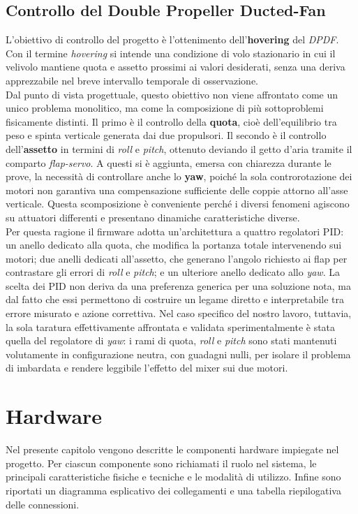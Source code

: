 \documentclass[11pt]{report}
\begin{document}
	\section{Controllo del Double Propeller Ducted-Fan}
	L'obiettivo di controllo del progetto è l'ottenimento dell'\textbf{hovering} del \textit{DPDF}. Con il termine \textit{hovering} si intende una condizione di volo stazionario in cui il velivolo mantiene quota e assetto prossimi ai valori desiderati, senza una deriva apprezzabile nel breve intervallo temporale di osservazione.\\
	Dal punto di vista progettuale, questo obiettivo non viene affrontato come un unico problema monolitico, ma come la composizione di più sottoproblemi fisicamente distinti. Il primo è il controllo della \textbf{quota}, cioè dell'equilibrio tra peso e spinta verticale generata dai due propulsori. Il secondo è il controllo dell'\textbf{assetto} in termini di \textit{roll} e \textit{pitch}, ottenuto deviando il getto d'aria tramite il comparto \textit{flap-servo}. A questi si è aggiunta, emersa con chiarezza durante le prove, la necessità di controllare anche lo \textbf{yaw}, poiché la sola controrotazione dei motori non garantiva una compensazione sufficiente delle coppie attorno all'asse verticale. Questa scomposizione è conveniente perché i diversi fenomeni agiscono su attuatori differenti e presentano dinamiche caratteristiche diverse.\\
	Per questa ragione il firmware adotta un'architettura a quattro regolatori PID: un anello dedicato alla quota, che modifica la portanza totale intervenendo sui motori; due anelli dedicati all'assetto, che generano l'angolo richiesto ai flap per contrastare gli errori di \textit{roll} e \textit{pitch}; e un ulteriore anello dedicato allo \textit{yaw}. La scelta dei PID non deriva da una preferenza generica per una soluzione nota, ma dal fatto che essi permettono di costruire un legame diretto e interpretabile tra errore misurato e azione correttiva. Nel caso specifico del nostro lavoro, tuttavia, la sola taratura effettivamente affrontata e validata sperimentalmente è stata quella del regolatore di \textit{yaw}: i rami di quota, \textit{roll} e \textit{pitch} sono stati mantenuti volutamente in configurazione neutra, con guadagni nulli, per isolare il problema di imbardata e rendere leggibile l'effetto del mixer sui due motori.
	
	\newpage
	\chapter{Hardware}
	\label{Hardware}
	Nel presente capitolo vengono descritte le componenti hardware impiegate nel progetto.
	Per ciascun componente sono richiamati il ruolo nel sistema, le principali
	caratteristiche fisiche e tecniche e le modalità di utilizzo. Infine sono riportati un
	diagramma esplicativo dei collegamenti e una tabella riepilogativa delle connessioni.
\end{document}
